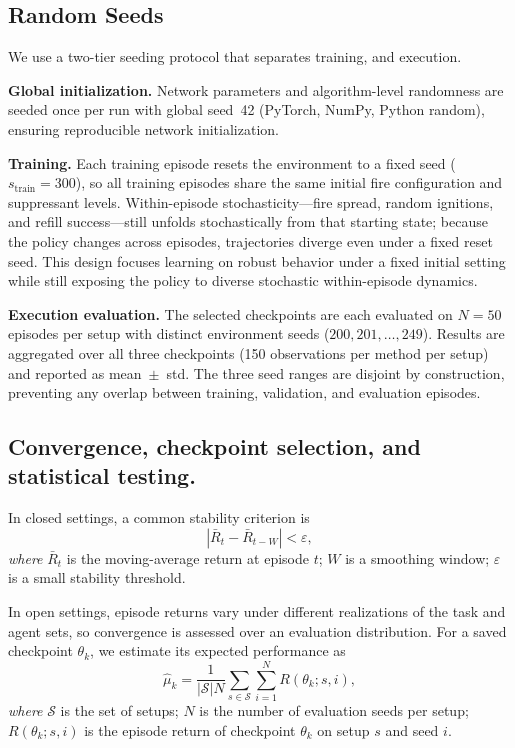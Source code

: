 \clearpage

\subsection{Random Seeds}\label{app:random_seed}
We use a two-tier seeding protocol that separates training, and execution.

\textbf{Global initialization.} Network parameters and algorithm-level randomness are seeded once per run with global seed~42 (PyTorch, NumPy, Python random), ensuring reproducible network initialization.

\textbf{Training.} Each training episode resets the environment to a fixed seed ($s_{\text{train}}=300$), so all training episodes share the same initial fire configuration and suppressant levels. Within-episode stochasticity---fire spread, random ignitions, and refill success---still unfolds stochastically from that starting state; because the policy changes across episodes, trajectories diverge even under a fixed reset seed. This design focuses learning on robust behavior under a fixed initial setting while still exposing the policy to diverse stochastic within-episode dynamics.

\textbf{Execution evaluation.} The selected checkpoints are each evaluated on $N=50$ episodes per setup with distinct environment seeds ($200, 201, \ldots, 249$). Results are aggregated over all three checkpoints (150 observations per method per setup) and reported as mean~$\pm$~std. The three seed ranges are disjoint by construction, preventing any overlap between training, validation, and evaluation episodes.



\subsection{Convergence, checkpoint selection, and statistical testing.}\label{sec:convergence_appendix}
In closed settings, a common stability criterion is
\begin{equation}
\left| \bar{R}_{t} - \bar{R}_{t-W} \right| < \varepsilon ,
\end{equation}
\noindent\textit{where} $\bar{R}_{t}$ is the moving-average return at episode $t$; $W$ is a smoothing window; $\varepsilon$ is a small stability threshold.

In open settings, episode returns vary under different realizations of the task and agent sets, so convergence is assessed over an evaluation distribution.
For a saved checkpoint $\theta_k$, we estimate its expected performance as
\begin{equation}
\hat{\mu}_k = \frac{1}{|\mathcal{S}|N}\sum_{s\in \mathcal{S}}\sum_{i=1}^{N} R(\theta_k; s, i),
\end{equation}
\noindent\textit{where} $\mathcal{S}$ is the set of setups; $N$ is the number of evaluation seeds per setup; $R(\theta_k; s,i)$ is the episode return of checkpoint $\theta_k$ on setup $s$ and seed $i$.


